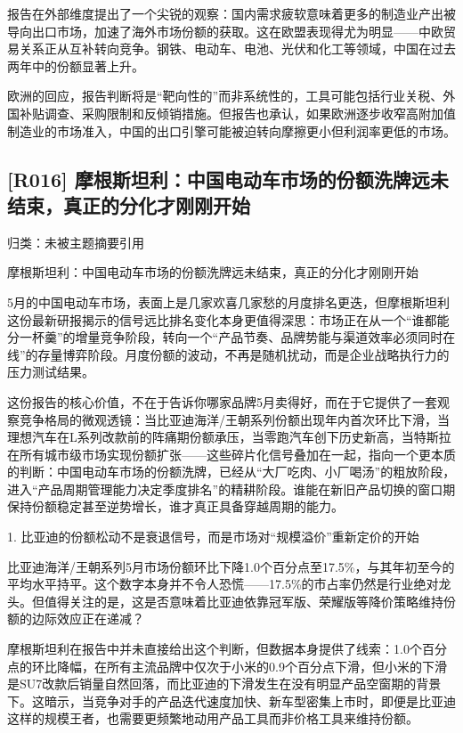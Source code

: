 \documentclass[11pt]{ctexart}
\begin{document}
报告在外部维度提出了一个尖锐的观察：国内需求疲软意味着更多的制造业产出被导向出口市场，加速了海外市场份额的获取。这在欧盟表现得尤为明显——中欧贸易关系正从互补转向竞争。钢铁、电动车、电池、光伏和化工等领域，中国在过去两年中的份额显著上升。

欧洲的回应，报告判断将是“靶向性的”而非系统性的，工具可能包括行业关税、外国补贴调查、采购限制和反倾销措施。但报告也承认，如果欧洲逐步收窄高附加值制造业的市场准入，中国的出口引擎可能被迫转向摩擦更小但利润率更低的市场。

\subsection{[R016] 摩根斯坦利：中国电动车市场的份额洗牌远未结束，真正的分化才刚刚开始}
{\small\color{refgray}归类：未被主题摘要引用}

摩根斯坦利：中国电动车市场的份额洗牌远未结束，真正的分化才刚刚开始

5月的中国电动车市场，表面上是几家欢喜几家愁的月度排名更迭，但摩根斯坦利这份最新研报揭示的信号远比排名变化本身更值得深思：市场正在从一个“谁都能分一杯羹”的增量竞争阶段，转向一个“产品节奏、品牌势能与渠道效率必须同时在线”的存量博弈阶段。月度份额的波动，不再是随机扰动，而是企业战略执行力的压力测试结果。

这份报告的核心价值，不在于告诉你哪家品牌5月卖得好，而在于它提供了一套观察竞争格局的微观透镜：当比亚迪海洋/王朝系列份额出现年内首次环比下滑，当理想汽车在L系列改款前的阵痛期份额承压，当零跑汽车创下历史新高，当特斯拉在所有城市级市场实现份额扩张——这些碎片化信号叠加在一起，指向一个更本质的判断：中国电动车市场的份额洗牌，已经从“大厂吃肉、小厂喝汤”的粗放阶段，进入“产品周期管理能力决定季度排名”的精耕阶段。谁能在新旧产品切换的窗口期保持份额稳定甚至逆势增长，谁才真正具备穿越周期的能力。

1. 比亚迪的份额松动不是衰退信号，而是市场对“规模溢价”重新定价的开始

比亚迪海洋/王朝系列5月市场份额环比下降1.0个百分点至17.5\%，与其年初至今的平均水平持平。这个数字本身并不令人恐慌——17.5\%的市占率仍然是行业绝对龙头。但值得关注的是，这是否意味着比亚迪依靠冠军版、荣耀版等降价策略维持份额的边际效应正在递减？

摩根斯坦利在报告中并未直接给出这个判断，但数据本身提供了线索：1.0个百分点的环比降幅，在所有主流品牌中仅次于小米的0.9个百分点下滑，但小米的下滑是SU7改款后销量自然回落，而比亚迪的下滑发生在没有明显产品空窗期的背景下。这暗示，当竞争对手的产品迭代速度加快、新车型密集上市时，即便是比亚迪这样的规模王者，也需要更频繁地动用产品工具而非价格工具来维持份额。
\end{document}
